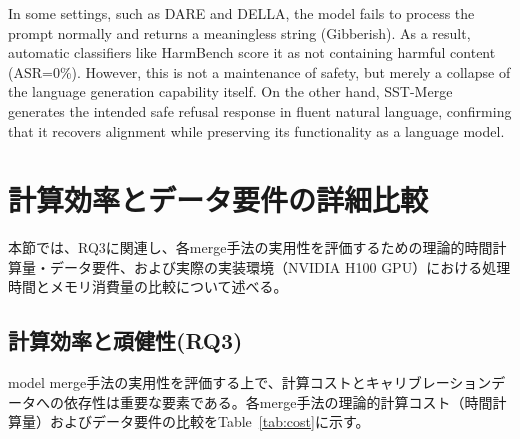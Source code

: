 \documentclass{article}
\begin{document}
In some settings, such as DARE and DELLA, the model fails to process the prompt normally and returns a meaningless string (Gibberish). As a result, automatic classifiers like HarmBench score it as not containing harmful content (ASR=0\%). However, this is not a maintenance of safety, but merely a collapse of the language generation capability itself. On the other hand, SST-Merge generates the intended safe refusal response in fluent natural language, confirming that it recovers alignment while preserving its functionality as a language model.



\section{計算効率とデータ要件の詳細比較}
\label{app:計算効率とデータ要件の詳細比較}
本節では、RQ3に関連し、各merge手法の実用性を評価するための理論的時間計算量・データ要件、および実際の実装環境（NVIDIA H100 GPU）における処理時間とメモリ消費量の比較について述べる。

\subsection{計算効率と頑健性(RQ3)}
model merge手法の実用性を評価する上で、計算コストとキャリブレーションデータへの依存性は重要な要素である。各merge手法の理論的計算コスト（時間計算量）およびデータ要件の比較をTable~\ref{tab:cost}に示す。
\end{document}
